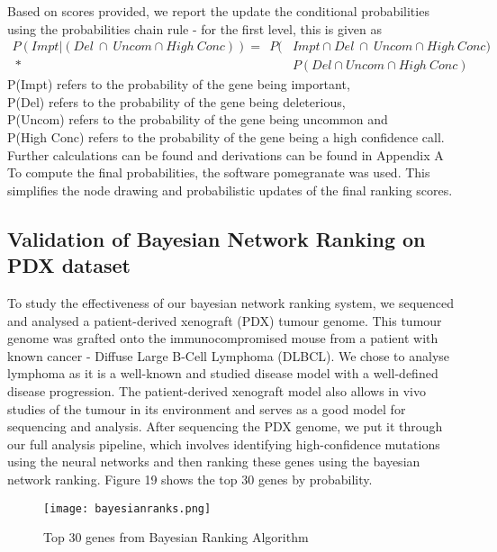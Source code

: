 \documentclass{article}
\begin{document}
Based on scores provided, we report the update the conditional probabilities using the probabilities chain rule - for the first level, this is given as \\
\begin{equation}
\begin{split}
P(Impt | (Del  \ \cap \ Uncom  \cap High\ Conc)) =  \ \ P(&Impt \cap Del  \ \cap \ Uncom \cap High \ Conc ) \\ \ * \ & P(Del  \cap Uncom  \cap High \ Conc )
\end{split}
\end{equation}
\tiny
\indent
P(Impt) refers to the probability of the gene being important,\\
\indent P(Del) refers to the probability of the gene being deleterious,\\ 
\indent P(Uncom) refers to the probability of the gene being uncommon and\\  \indent P(High Conc) refers to the probability of the gene being a high confidence call.\\ \indent Further calculations can be found and derivations can be found in Appendix A\\

\normalsize
\noindent
To compute the final probabilities, the software pomegranate was used. This simplifies the node drawing and probabilistic updates of the final ranking scores.
\subsection{Validation of Bayesian Network Ranking on PDX dataset}
To study the effectiveness of our bayesian network ranking system, we sequenced and analysed a patient-derived xenograft (PDX) tumour genome. This tumour genome was grafted onto the immunocompromised mouse from a patient with known cancer - Diffuse Large B-Cell Lymphoma (DLBCL). We chose to analyse lymphoma as it is a well-known and studied disease model with a well-defined disease progression. The patient-derived xenograft model also allows in vivo studies of the tumour in its environment and serves as a good model for sequencing and analysis. After sequencing the PDX genome, we put it through our full analysis pipeline, which involves identifying high-confidence mutations using the neural networks and then ranking these genes using the bayesian network ranking. Figure 19 shows the top 30 genes by probability. 

\begin{figure}[H]
\texttt{[image: bayesianranks.png]}
\caption{Top 30 genes from Bayesian Ranking Algorithm}
\centering
\end{figure}
\end{document}
